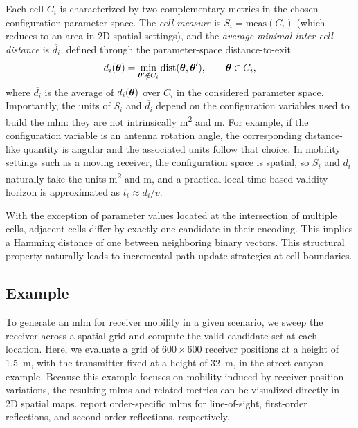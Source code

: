 Each cell $C_i$ is characterized by two complementary metrics in the chosen configuration-parameter space. The \emph{cell measure} is $S_i = \mathrm{meas}(C_i)$ (which reduces to an area in 2D spatial settings), and the \emph{average minimal inter-cell distance} is $\overline{d_i}$, defined through the parameter-space distance-to-exit
\begin{equation}
  d_i(\boldsymbol{\theta}) = \min_{\boldsymbol{\theta}' \notin C_i} \mathrm{dist}(\boldsymbol{\theta}, \boldsymbol{\theta}'), \qquad \boldsymbol{\theta} \in C_i,
\end{equation}
where $\overline{d_i}$ is the average of $d_i(\boldsymbol{\theta})$ over $C_i$ in the considered parameter space. Importantly, the units of $S_i$ and $\overline{d_i}$ depend on the configuration variables used to build the \gls{mlm}: they are not intrinsically \unit{\meter\squared} and \unit{\meter}. For example, if the configuration variable is an antenna rotation angle, the corresponding distance-like quantity is angular and the associated units follow that choice. In mobility settings such as a moving receiver, the configuration space is spatial, so $S_i$ and $\overline{d_i}$ naturally take the units \unit{\meter\squared} and \unit{\meter}, and a practical local time-based validity horizon is approximated as $t_i \approx \overline{d_i}/v$.

With the exception of parameter values located at the intersection of multiple cells, adjacent cells differ by exactly one candidate in their encoding. This implies a Hamming distance of one between neighboring binary vectors. This structural property naturally leads to incremental path-update strategies at cell boundaries.

\subsection{Example \texorpdfstring{}{Multipath Lifetime Maps}}

To generate an \gls{mlm} for receiver mobility in a given scenario, we sweep the receiver across a spatial grid and compute the valid-candidate set at each location. Here, we evaluate a grid of $600\times 600$ receiver positions at a height of \qty{1.5}{\meter}, with the transmitter fixed at a height of \qty{32}{\meter}, in the street-canyon example. Because this example focuses on mobility induced by receiver-position variations, the resulting \glspl{mlm} and related metrics can be visualized directly in 2D spatial maps.  report order-specific \glspl{mlm} for \gls{line-of-sight}, first-order reflections, and second-order reflections, respectively.

